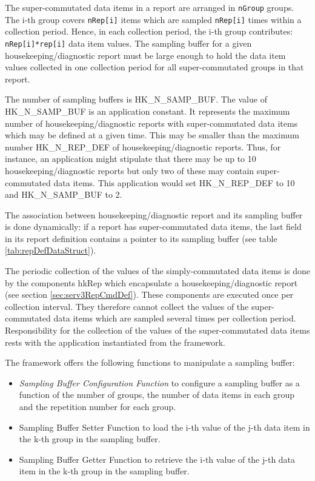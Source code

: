 \documentclass{pnp_article}
\begin{document}
The super-commutated data items in a report are arranged in \texttt{nGroup} groups. The i-th group covers \texttt{nRep[i]} items which are sampled \texttt{nRep[i]} times within a collection period. Hence, in each collection period, the i-th group contributes: \texttt{nRep[i]*rep[i]} data item values. The sampling buffer for a given housekeeping/diagnostic report must be large enough to hold the data item values collected in one collection period for all super-commutated groups in that report.

The number of sampling buffers is HK\_N\_SAMP\_BUF. The value of HK\_N\_SAMP\_BUF is an application constant. It represents the maximum number of housekeeping/diagnostic reports with super-commutated data items which may be defined at a given time. This may be smaller than the maximum number HK\_N\_REP\_DEF of housekeeping/diagnostic reports. Thus, for instance, an application might stipulate that there may be up to 10 housekeeping/diagnostic reports but only two of these may contain super-commutated data items. This application would set HK\_N\_REP\_DEF to 10 and  HK\_N\_SAMP\_BUF to 2.

The association between housekeeping/diagnostic report and its sampling buffer is done dynamically: if a report has super-commutated data items, the last field in its report definition contains a pointer to its sampling buffer (see table \ref{tab:repDefDataStruct}).

The periodic collection of the values of the simply-commutated data items is done by the components hkRep which encapsulate a housekeeping/diagnostic report (see section \ref{sec:serv3RepCmdDef}). These components are executed once per collection interval. They therefore cannot collect the values of the super-commutated data items which are sampled several times per collection period. Responsibility for the collection of the values of the super-commutated data items rests with the application instantiated from the framework. 

The framework offers the following functions to manipulate a sampling buffer:

\begin{itemize}
\item \textit{Sampling Buffer Configuration Function} to configure a sampling buffer as a function of the number of groups, the number of data items in each group and the repetition number for each group.
\item Sampling Buffer Setter Function to load the i-th value of the j-th data item in the k-th group in the sampling buffer.
\item Sampling Buffer Getter Function to retrieve the i-th value of the j-th data item in the k-th group in the sampling buffer.
\end{itemize}
\end{document}
